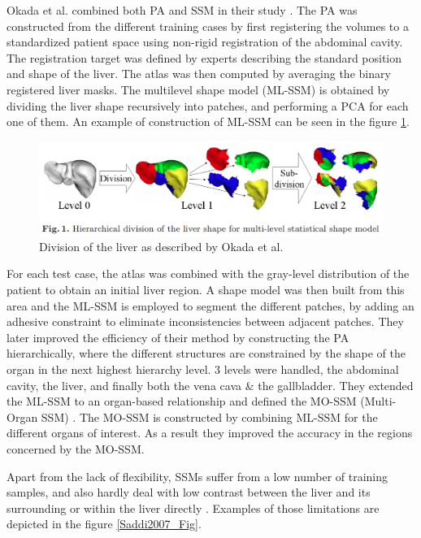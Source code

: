 \documentclass[]{article}
\begin{document}
	Okada et al. combined both PA and SSM in their study \cite{Okada2008}. The PA was
	constructed from the different training cases by first registering the
	volumes to a standardized patient space using non-rigid registration of
	the abdominal cavity. The registration target was defined by experts
	describing the standard position and shape of the liver. The atlas was
	then computed by averaging the binary registered liver masks. The
	multilevel shape model (ML-SSM) is obtained by dividing the liver shape
	recursively into patches, and performing a PCA for each one of them. An
	example of construction of ML-SSM can be seen in the figure \ref{Okada2008_Fig1}.
	
	\begin{figure}[th!]
		\centering
		\includegraphics[width=0.7\linewidth]{images/image38}
		\caption{Division of the liver as described by Okada et al. \cite{Okada2008}}
		\label{Okada2008_Fig1}
	\end{figure}
	
	
	
	For each test case, the atlas was combined with the gray-level
	distribution of the patient to obtain an initial liver region. A shape
	model was then built from this area and the ML-SSM is employed to
	segment the different patches, by adding an adhesive constraint to
	eliminate inconsistencies between adjacent patches. They later improved
	the efficiency of their method by constructing the PA hierarchically,
	where the different structures are constrained by the shape of the organ
	in the next highest hierarchy level. 3 levels were handled, the
	abdominal cavity, the liver, and finally both the vena cava \& the
	gallbladder. They extended the ML-SSM to an organ-based relationship and
	defined the MO-SSM (Multi-Organ SSM) \cite{Okada2008}. The MO-SSM is constructed by combining ML-SSM for the
	different organs of interest. As a result they improved the accuracy in
	the regions concerned by the MO-SSM.
	
	
	Apart from the lack of flexibility, SSMs suffer from a low number of
	training samples, and also hardly deal with low contrast between the
	liver and its surrounding or within the liver directly \cite{Saddi2007, Lamecker2004}. Examples of those limitations are depicted in the figure \ref{Saddi2007_Fig}.
	
\end{document}
